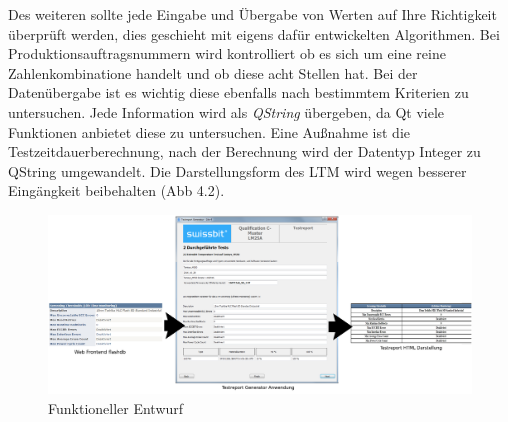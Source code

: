 Des weiteren sollte jede Eingabe und Übergabe von Werten auf Ihre Richtigkeit überprüft werden, dies geschieht mit eigens dafür entwickelten Algorithmen. 
Bei Produktionsauftragsnummern wird kontrolliert ob es sich um eine reine Zahlenkombinatione handelt und ob diese acht Stellen hat. Bei der Datenübergabe ist es wichtig diese ebenfalls nach bestimmtem Kriterien zu untersuchen. Jede Information wird als \textit{QString} übergeben, da Qt viele Funktionen anbietet diese zu untersuchen. Eine Außnahme ist die Testzeitdauerberechnung, nach der Berechnung wird der Datentyp Integer zu QString umgewandelt. 
Die Darstellungsform des \ac{LTM} wird wegen besserer Eingängkeit beibehalten (Abb 4.2).

\begin{figure}[H]
\includegraphics[scale=0.22]{images/ltm_gui}
\caption{Funktioneller Entwurf}
\label{fig:Entwurf funktioneller Ablauf}
\end{figure}


